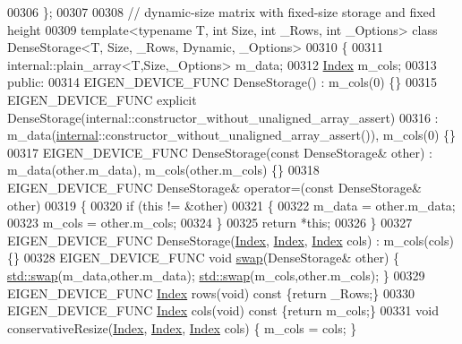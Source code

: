 \begin{DoxyCode}
00306 \};
00307 
00308 \textcolor{comment}{// dynamic-size matrix with fixed-size storage and fixed height}
00309 \textcolor{keyword}{template}<\textcolor{keyword}{typename} T, \textcolor{keywordtype}{int} Size, \textcolor{keywordtype}{int} \_Rows, \textcolor{keywordtype}{int} \_Options> \textcolor{keyword}{class }DenseStorage<T, Size, \_Rows, Dynamic,
       \_Options>
00310 \{
00311     internal::plain\_array<T,Size,\_Options> m\_data;
00312     \hyperlink{namespace_eigen_a62e77e0933482dafde8fe197d9a2cfde}{Index} m\_cols;
00313   \textcolor{keyword}{public}:
00314     EIGEN\_DEVICE\_FUNC DenseStorage() : m\_cols(0) \{\}
00315     EIGEN\_DEVICE\_FUNC \textcolor{keyword}{explicit} DenseStorage(internal::constructor\_without\_unaligned\_array\_assert)
00316       : m\_data(\hyperlink{namespaceinternal}{internal}::constructor\_without\_unaligned\_array\_assert()), m\_cols(0) \{\}
00317     EIGEN\_DEVICE\_FUNC DenseStorage(\textcolor{keyword}{const} DenseStorage& other) : m\_data(other.m\_data), m\_cols(other.m\_cols) 
      \{\}
00318     EIGEN\_DEVICE\_FUNC DenseStorage& operator=(\textcolor{keyword}{const} DenseStorage& other)
00319     \{
00320       \textcolor{keywordflow}{if} (\textcolor{keyword}{this} != &other)
00321       \{
00322         m\_data = other.m\_data;
00323         m\_cols = other.m\_cols;
00324       \}
00325       \textcolor{keywordflow}{return} *\textcolor{keyword}{this};
00326     \}
00327     EIGEN\_DEVICE\_FUNC DenseStorage(\hyperlink{namespace_eigen_a62e77e0933482dafde8fe197d9a2cfde}{Index}, \hyperlink{namespace_eigen_a62e77e0933482dafde8fe197d9a2cfde}{Index}, \hyperlink{namespace_eigen_a62e77e0933482dafde8fe197d9a2cfde}{Index} cols) : m\_cols(cols) \{\}
00328     EIGEN\_DEVICE\_FUNC \textcolor{keywordtype}{void} \hyperlink{endian_8c_a3ca5ecd34b04d6a243c054ac3a57f68d}{swap}(DenseStorage& other) \{ \hyperlink{endian_8c_a3ca5ecd34b04d6a243c054ac3a57f68d}{std::swap}(m\_data,other.m\_data); 
      \hyperlink{endian_8c_a3ca5ecd34b04d6a243c054ac3a57f68d}{std::swap}(m\_cols,other.m\_cols); \}
00329     EIGEN\_DEVICE\_FUNC \hyperlink{namespace_eigen_a62e77e0933482dafde8fe197d9a2cfde}{Index} rows(\textcolor{keywordtype}{void})\textcolor{keyword}{ const }\{\textcolor{keywordflow}{return} \_Rows;\}
00330     EIGEN\_DEVICE\_FUNC \hyperlink{namespace_eigen_a62e77e0933482dafde8fe197d9a2cfde}{Index} cols(\textcolor{keywordtype}{void})\textcolor{keyword}{ const }\{\textcolor{keywordflow}{return} m\_cols;\}
00331     \textcolor{keywordtype}{void} conservativeResize(\hyperlink{namespace_eigen_a62e77e0933482dafde8fe197d9a2cfde}{Index}, \hyperlink{namespace_eigen_a62e77e0933482dafde8fe197d9a2cfde}{Index}, \hyperlink{namespace_eigen_a62e77e0933482dafde8fe197d9a2cfde}{Index} cols) \{ m\_cols = cols; \}

\end{DoxyCode}
